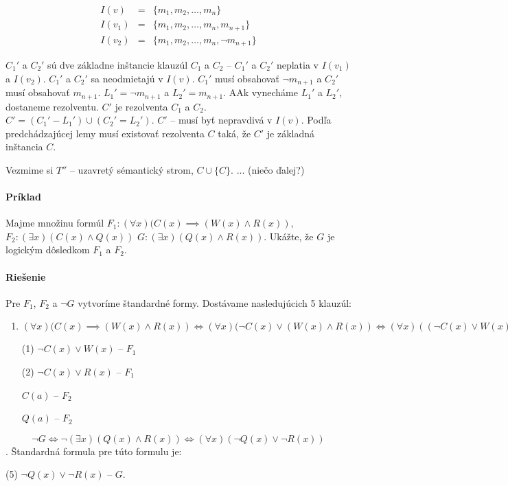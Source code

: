 \begin{eqnarray*}
I(v) &=& \{ m_1, m_2, \ldots, m_n \} \\
I(v_1) &=& \{ m_1, m_2, \ldots, m_n, m_{n+1} \}  \\
I(v_2) &=& \{ m_1, m_2, \ldots, m_n, \neg m_{n+1} \} 
\end{eqnarray*}

$C_1'$ a $C_2'$ sú dve základne inštancie klauzúl $C_1$ a $C_2$ -- $C_1'$ a
$C_2'$ neplatia v $I(v_1)$ a $I(v_2)$. $C_1'$ a $C_2'$ sa neodmietajú v $I(v)$.
$C_1'$ musí obsahovať $\neg m_{n+1}$ a $C_2'$ musí obsahovať $m_{n+1}$. $L_1' =
\neg m_{n+1}$ a $L_2' = m_{n+1}$. AAk vynecháme $L_1'$ a $L_2'$, dostaneme
rezolventu. $C'$ je rezolventa $C_1$ a $C_2$. $C' = (C_1' - L_1') \cup (C_2' =
L_2')$. $C'$ -- musí byť nepravdivá v $I(v)$. Podľa predchádzajúcej lemy musí
existovať rezolventa $C$ taká, že $C'$ je základná inštancia $C$.

\par Vezmime si $T''$ -- uzavretý sémantický strom, $C \cup \{C\}$. ... (niečo
ďalej?)



\paragraph{Príklad} Majme množinu formúl $F_1: (\forall x) (C(x) \implies (W(x)
\land R(x))$, $F_2: (\exists x)(C(x) \land Q(x))$ $G: (\exists x) (Q(x) \land
R(x))$. Ukážte, že $G$ je logickým dôsledkom $F_1$ a $F_2$.

\paragraph{Riešenie} Pre $F_1$, $F_2$ a $\neg G$ vytvoríme štandardné formy.
Dostávame nasledujúcich 5 klauzúl:
\begin{enumerate}
	\item $(\forall x) (C(x) \implies (W(x) \land R(x)) \iff (\forall
	x)(\neg C(x) \lor (W(x)\land R(x)) \iff (\forall x) ((\neg C(x) \lor
	W(x)) \land (\neg C(x) \lor R(x)))$
	\par (1) $\neg C(x) \lor W(x)$ -- $F_1$
	\par (2) $\neg C(x) \lor R(x)$ -- $F_1$
	\par $C(a)$ -- $F_2$
	\par $Q(a)$ -- $F_2$
\end{enumerate}
$$\neg G \iff \neg (\exists x)(Q(x)\land R(x)) \iff (\forall x) (\neg Q(x) \lor
\neg R(x)) $$. Štandardná formula pre túto formulu je:
\par (5) $\neg Q(x) \lor \neg R(x)$ -- $G$.

